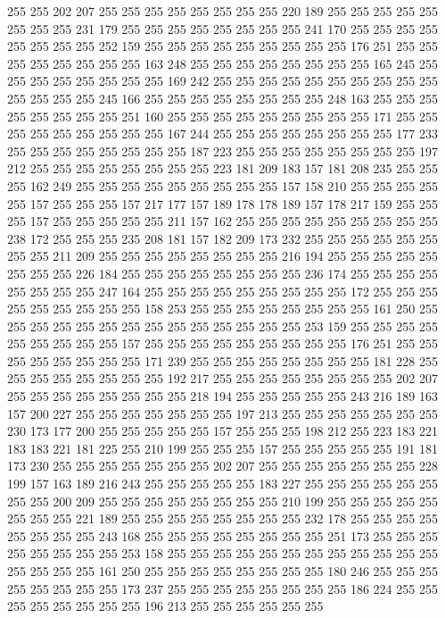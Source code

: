 255 255 202 207 255 255 255 255 255 255 255 255 220 189 255 255 255 255 255 255
255 255 231 179 255 255 255 255 255 255 255 255 241 170 255 255 255 255 255 255
255 255 252 159 255 255 255 255 255 255 255 255 255 176 251 255 255 255 255 255
255 255 255 163 248 255 255 255 255 255 255 255 255 165 245 255 255 255 255 255
255 255 255 169 242 255 255 255 255 255 255 255 255 255 255 255 255 255 255 245
166 255 255 255 255 255 255 255 255 248 163 255 255 255 255 255 255 255 255 251
160 255 255 255 255 255 255 255 255 255 171 255 255 255 255 255 255 255 255 255
167 244 255 255 255 255 255 255 255 255 177 233 255 255 255 255 255 255 255 255
187 223 255 255 255 255 255 255 255 255 197 212 255 255 255 255 255 255 255 255
223 181 209 183 157 181 208 235 255 255 255 162 249 255 255 255 255 255 255 255
255 255 157 158 210 255 255 255 255 255 157 255 255 255 157 217 177 157 189 178
178 189 157 178 217 159 255 255 255 157 255 255 255 255 255 211 157 162 255 255
255 255 255 255 255 255 255 238 172 255 255 255 235 208 181 157 182 209 173 232
255 255 255 255 255 255 255 255 211 209 255 255 255 255 255 255 255 255 216 194
255 255 255 255 255 255 255 255 226 184 255 255 255 255 255 255 255 255 236 174
255 255 255 255 255 255 255 255 247 164 255 255 255 255 255 255 255 255 255 172
255 255 255 255 255 255 255 255 255 158 253 255 255 255 255 255 255 255 255 161
250 255 255 255 255 255 255 255 255 255 255 255 255 255 255 253 159 255 255 255
255 255 255 255 255 255 157 255 255 255 255 255 255 255 255 255 176 251 255 255
255 255 255 255 255 255 171 239 255 255 255 255 255 255 255 255 181 228 255 255
255 255 255 255 255 255 192 217 255 255 255 255 255 255 255 255 202 207 255 255
255 255 255 255 255 255 218 194 255 255 255 255 255 243 216 189 163 157 200 227
255 255 255 255 255 255 255 197 213 255 255 255 255 255 255 255 230 173 177 200
255 255 255 255 255 157 255 255 255 198 212 255 223 183 221 183 183 221 181 225
255 210 199 255 255 255 157 255 255 255 255 255 191 181 173 230 255 255 255 255
255 255 255 202 207 255 255 255 255 255 255 255 228 199 157 163 189 216 243 255
255 255 255 255 183 227 255 255 255 255 255 255 255 255 200 209 255 255 255 255
255 255 255 255 210 199 255 255 255 255 255 255 255 255 221 189 255 255 255 255
255 255 255 255 232 178 255 255 255 255 255 255 255 255 243 168 255 255 255 255
255 255 255 255 251 173 255 255 255 255 255 255 255 255 253 158 255 255 255 255
255 255 255 255 255 255 255 255 255 255 255 255 161 250 255 255 255 255 255 255
255 255 180 246 255 255 255 255 255 255 255 255 173 237 255 255 255 255 255 255
255 255 186 224 255 255 255 255 255 255 255 255 196 213 255 255 255 255 255 255
